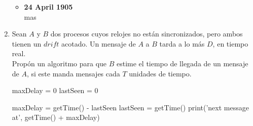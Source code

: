 \documentclass[12pt,a4paper]{report}
\begin{document}
\begin{enumerate}
{\begin{itemize}
{                Este escrito nos relata la historia de un hombre y los mundos
                que se bifurcan a partir de una decisión que toma.\\
                En el primer mundo, decide asentarse, trabajar duro, disfrutar
                momentos con sus amigos. Un día conoce a una mujer, la corteja
                a lo largo de unos meses y envejecen juntos.\\
                En el segundo mundo, decide hablar con la mujer de sus sueños.
                Su sonrisa, su risa, su elocuencia al hablar lo enamoran. Lo
                convence de cambiar de ciudad para vivir con ella y viven una
                vida apacionada. Él es feliz.\\
                En el tercer mundo, igual que en el segundo, decide hablar con
                ella, pero ella lo rechaza.\\
                Así se desarrolla la vida en este universo. Cada decisión que se
                toma se bifurca en otros mundos en los que la historia se
                desarrolla de manera diferente; y hay una infinidad de ellos.\\
            }
            \item{\textbf{24 April 1905}\\
                mas
            }
        \end{itemize}
	}

	\item {
		Sean $A$ y $B$ dos procesos cuyos relojes no están sincronizados,
		pero ambos tienen un $drift$ acotado. Un mensaje de $A$ a $B$
		tarda a lo más $D$, en tiempo real.\\
		Propón un algoritmo para que $B$ estime el tiempo de llegada de un
		mensaje de $A$, si este manda mensajes cada $T$ unidades de tiempo.

		\begin{algorithmic}[1]
			\Initially
			 	\State maxDelay = 0
				\State lastSeen = 0
			\EndInitially
			\Statex

					\State maxDelay = getTime() - lastSeen
				\EndIf
				\State lastSeen = getTime()
				\State print('next message at', getTime() + maxDelay)
			\EndUpon
		\end{algorithmic}
	}
\end{enumerate}
\end{document}

